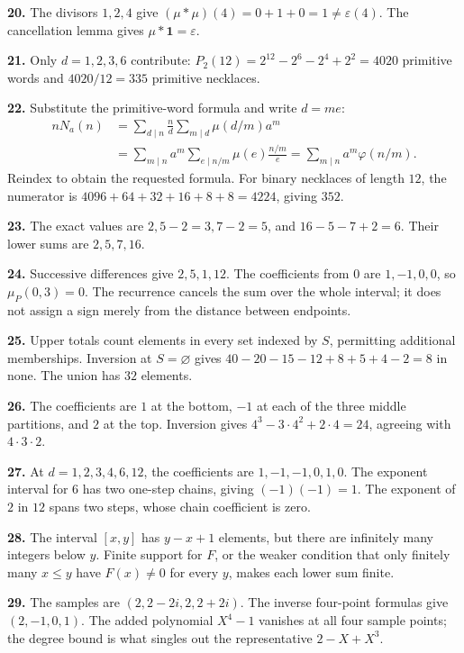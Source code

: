 \textbf{20.} The divisors $1,2,4$ give
$(\mu*\mu)(4)=0+1+0=1\ne\varepsilon(4)$.
The cancellation lemma gives $\mu*\mathbf{1}=\varepsilon$.

\textbf{21.} Only $d=1,2,3,6$ contribute:
$P_2(12)=2^{12}-2^6-2^4+2^2=4020$ primitive words and
$4020/12=335$ primitive necklaces.

\textbf{22.} Substitute the primitive-word formula and write $d=me$:
\[
 \begin{aligned}
 nN_a(n)
 &=\sum_{d\mid n}\frac nd\sum_{m\mid d}\mu(d/m)a^m\\
 &=\sum_{m\mid n}a^m\sum_{e\mid n/m}\mu(e)\frac{n/m}{e}
 =\sum_{m\mid n}a^m\varphi(n/m).
 \end{aligned}
\]
Reindex to obtain the requested formula. For binary necklaces of
length $12$, the numerator is $4096+64+32+16+8+8=4224$, giving $352$.

\textbf{23.} The exact values are $2,5-2=3,7-2=5$, and
$16-5-7+2=6$. Their lower sums are $2,5,7,16$.

\textbf{24.} Successive differences give $2,5,1,12$.
The coefficients from $0$ are $1,-1,0,0$, so $\mu_P(0,3)=0$.
The recurrence cancels the sum over the whole interval; it does
not assign a sign merely from the distance between endpoints.

\textbf{25.} Upper totals count elements in every set indexed by
$S$, permitting additional memberships. Inversion at $S=\varnothing$
gives $40-20-15-12+8+5+4-2=8$ in none. The union has $32$ elements.

\textbf{26.} The coefficients are $1$ at the bottom, $-1$ at each
of the three middle partitions, and $2$ at the top. Inversion gives
$4^3-3\cdot4^2+2\cdot4=24$, agreeing with $4\cdot3\cdot2$.

\textbf{27.} At $d=1,2,3,4,6,12$, the coefficients are
$1,-1,-1,0,1,0$. The exponent interval for $6$ has two one-step
chains, giving $(-1)(-1)=1$. The exponent of $2$ in $12$ spans
two steps, whose chain coefficient is zero.

\textbf{28.} The interval $[x,y]$ has $y-x+1$ elements, but
there are infinitely many integers below $y$. Finite support for
$F$, or the weaker condition that only finitely many $x\le y$
have $F(x)\ne0$ for every $y$, makes each lower sum finite.

\textbf{29.} The samples are $(2,2-2i,2,2+2i)$. The inverse
four-point formulas give $(2,-1,0,1)$. The added polynomial
$X^4-1$ vanishes at all four sample points; the degree bound is
what singles out the representative $2-X+X^3$.

